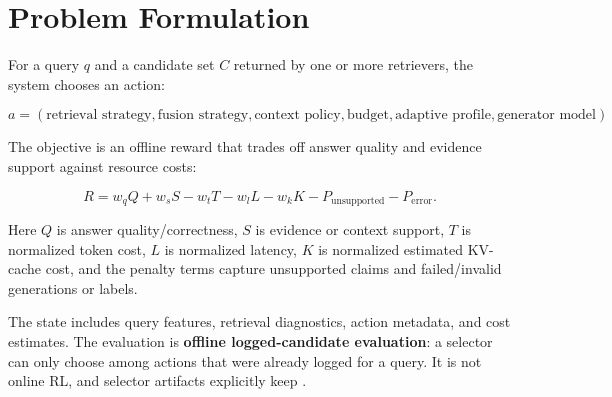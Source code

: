 \section{Problem Formulation}

For a query $q$ and a candidate set $C$ returned by one or more retrievers, the system chooses an action:

\[
a = (\text{retrieval strategy}, \text{fusion strategy}, \text{context policy}, \text{budget}, \text{adaptive profile}, \text{generator model}).
\]

The objective is an offline reward that trades off answer quality and evidence support against resource costs:

\[
R = w_q Q + w_s S - w_t T - w_l L - w_k K - P_{\text{unsupported}} - P_{\text{error}}.
\]

Here $Q$ is answer quality/correctness, $S$ is evidence or context support, $T$ is normalized token cost, $L$ is normalized latency, $K$ is normalized estimated KV-cache cost, and the penalty terms capture unsupported claims and failed/invalid generations or labels.

The state includes query features, retrieval diagnostics, action metadata, and cost estimates. The evaluation is \textbf{offline logged-candidate evaluation}: a selector can only choose among actions that were already logged for a query. It is not online RL, and selector artifacts explicitly keep .
